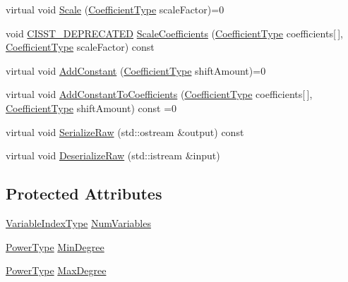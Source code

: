 \begin{DoxyCompactItemize}
\item 
virtual void \hyperlink{classnmr_polynomial_base_afe01d24b59008ee6bbb93d201dc585e6}{Scale} (\hyperlink{classnmr_polynomial_base_a8693efdfc8585ccb49abea69f74f3eef}{Coefficient\-Type} scale\-Factor)=0
\item 
void \hyperlink{cmn_portability_8h_a63da7164735f9501be651b1f2bbc0121}{C\-I\-S\-S\-T\-\_\-\-D\-E\-P\-R\-E\-C\-A\-T\-E\-D} \hyperlink{classnmr_polynomial_base_af620b263f1d97117bead1af1fc1e0379}{Scale\-Coefficients} (\hyperlink{classnmr_polynomial_base_a8693efdfc8585ccb49abea69f74f3eef}{Coefficient\-Type} coefficients\mbox{[}$\,$\mbox{]}, \hyperlink{classnmr_polynomial_base_a8693efdfc8585ccb49abea69f74f3eef}{Coefficient\-Type} scale\-Factor) const 
\item 
virtual void \hyperlink{classnmr_polynomial_base_a0ef8894033ea77d971fdf9a565061464}{Add\-Constant} (\hyperlink{classnmr_polynomial_base_a8693efdfc8585ccb49abea69f74f3eef}{Coefficient\-Type} shift\-Amount)=0
\item 
virtual void \hyperlink{classnmr_polynomial_base_ac539bd58986be490fb91970959e6ce93}{Add\-Constant\-To\-Coefficients} (\hyperlink{classnmr_polynomial_base_a8693efdfc8585ccb49abea69f74f3eef}{Coefficient\-Type} coefficients\mbox{[}$\,$\mbox{]}, \hyperlink{classnmr_polynomial_base_a8693efdfc8585ccb49abea69f74f3eef}{Coefficient\-Type} shift\-Amount) const =0
\item 
virtual void \hyperlink{classnmr_polynomial_base_a3663611e1e29322a62d7224babad4286}{Serialize\-Raw} (std\-::ostream \&output) const 
\item 
virtual void \hyperlink{classnmr_polynomial_base_a5c2c2a98bc2b230c1eddb437d5430259}{Deserialize\-Raw} (std\-::istream \&input)
\end{DoxyCompactItemize}
\subsection*{Protected Attributes}
\begin{DoxyCompactItemize}
\item 
\hyperlink{classnmr_polynomial_base_aae95477e451ddc7d3ee3f41cbdaadde2}{Variable\-Index\-Type} \hyperlink{classnmr_polynomial_base_ac8dad4ccf2d740abc1f4d3afe8e10cd2}{Num\-Variables}
\item 
\hyperlink{classnmr_polynomial_base_a58607c884bf2e6725a77ed4d9e14ba26}{Power\-Type} \hyperlink{classnmr_polynomial_base_a3380544a94773195706d04b22801cd6c}{Min\-Degree}
\item 
\hyperlink{classnmr_polynomial_base_a58607c884bf2e6725a77ed4d9e14ba26}{Power\-Type} \hyperlink{classnmr_polynomial_base_a33e3c6f203860a795be32d558fa05330}{Max\-Degree}
\end{DoxyCompactItemize}


